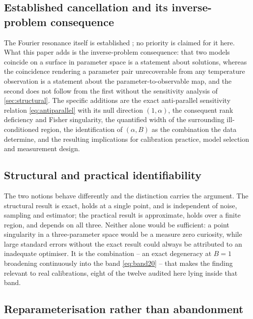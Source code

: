 \documentclass[preprint,12pt,a4paper]{elsarticle}
\theoremstyle{plain}
\theoremstyle{definition}
\theoremstyle{remark}
\newcommand{\Bnum}{B}
\begin{document}
\subsection{Established cancellation and its inverse-problem consequence}
\label{sec:disc-known}

The Fourier resonance itself is established
\cite{Kovacs2018,FulopKovacsVan2015,Fulop2018entropy,FeherKovacs2021}; no
priority is claimed for it here. What this paper adds is the inverse-problem
consequence: that two models coincide on a surface in parameter space is a
statement about solutions, whereas the coincidence rendering a parameter pair
unrecoverable from any temperature observation is a statement about the
parameter-to-observable map, and the second does not follow from the first
without the sensitivity analysis of \cref{sec:structural}. The specific
additions are the exact anti-parallel sensitivity relation
\eqref{eq:antiparallel} with its null direction $(1,\alpha)$, the consequent
rank deficiency and Fisher singularity, the quantified width of the
surrounding ill-conditioned region, the identification of $(\alpha,\Bnum)$ as
the combination the data determine, and the resulting implications for
calibration practice, model selection and measurement design.

\subsection{Structural and practical identifiability}
\label{sec:disc-struct-prac}

The two notions behave differently and the distinction carries the argument.
The structural result is exact, holds at a single point, and is independent
of noise, sampling and estimator; the practical result is approximate, holds
over a finite region, and depends on all three. Neither alone would be
sufficient: a point singularity in a three-parameter space would be a measure
zero curiosity, while large standard errors without the exact result could
always be attributed to an inadequate optimiser. It is the combination -- an
exact degeneracy at $\Bnum=1$ broadening continuously into the band
\eqref{eq:band20} -- that makes the finding relevant to real calibrations,
eight of the twelve audited here lying inside that band.

\subsection{Reparameterisation rather than abandonment}
\label{sec:disc-reparam}
\end{document}
